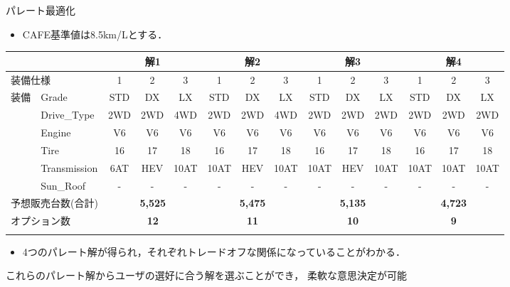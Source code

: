\documentclass[dvipdfmx, 11pt]{beamer}
\begin{document}
\begin{frame}{パレート最適化}
 \begin{itemize}
  \item CAFE基準値は8.5km/Lとする．
 \end{itemize}
 \begin{exampleblock}{}
  \centering
  \tiny
  \tabcolsep=1.5mm
  \begin{tabular}{l|l|c|c|c||c|c|c||c|c|c||c|c|c}
   \multicolumn{2}{l|}{} & \multicolumn{3}{c||}{解1} & \multicolumn{3}{c||}{解2} & \multicolumn{3}{c||}{解3} & \multicolumn{3}{c}{解4}\\ \hline
   \multicolumn{2}{l|}{装備仕様} & 1 & 2 & 3 & 1 & 2 & 3 & 1 & 2 & 3 & 1 & 2 & 3 \\ \hline
   装備 & Grade & STD & DX & LX & STD & DX & LX & STD & DX & LX & STD & DX & LX \\
       & Drive\_Type & 2WD & 2WD & \alert{4WD} & 2WD & 2WD & \alert{4WD} & 2WD & 2WD & \alert{2WD} & 2WD & 2WD & \alert{2WD}\\
       & Engine & V6 & V6 & V6 & V6 & V6 & V6 & V6 & V6 & V6 & V6 & V6 & V6 \\
       & Tire & 16 & 17 & 18 & 16 & 17 & 18 & 16 & 17 & 18 & 16 & 17 & 18 \\
       & Transmission & \alert{6AT} & \alert{HEV} & 10AT & \alert{10AT} & \alert{HEV} & 10AT & \alert{10AT} & \alert{HEV} & 10AT & \alert{10AT} & \alert{10AT} & 10AT \\
       & Sun\_Roof & - & - & - & - & - & - & - & - & - & - & - & - \\ \hline
   \multicolumn{2}{l|}{予想販売台数(合計)}  & \multicolumn{3}{c||}{\bf 5,525} & \multicolumn{3}{c||}{\bf 5,475} & \multicolumn{3}{c||}{\bf 5,135} & \multicolumn{3}{c}{\bf 4,723} \\ 
   \multicolumn{2}{l|}{オプション数} & \multicolumn{3}{c||}{\bf 12} & \multicolumn{3}{c||}{\bf 11} & \multicolumn{3}{c||}{\bf 10} & \multicolumn{3}{c}{\bf 9} \\
   \multicolumn{14}{c}{}
  \end{tabular}
 \end{exampleblock}
 \begin{itemize}
  \item 4つのパレート解が得られ，それぞれトレードオフな関係になっていることがわかる．
 \end{itemize}
 \begin{alertblock}{}
  これらのパレート解からユーザの選好に合う解を選ぶことができ，
  柔軟な意思決定が可能
 \end{alertblock}
\end{frame}
\end{document}
